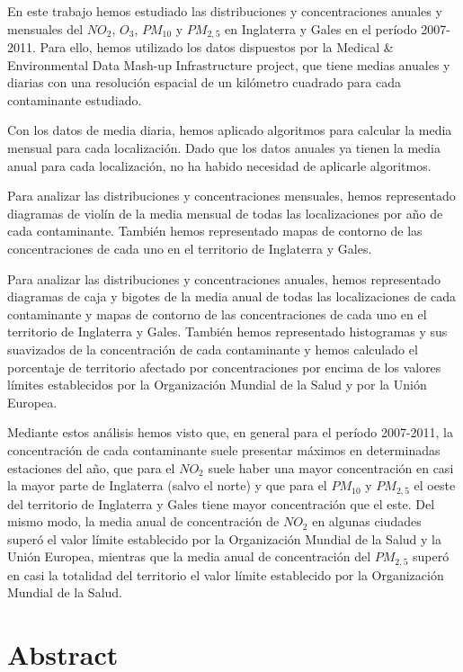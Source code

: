 \documentclass[12pt]{article}
\begin{document}
\normalsize En este trabajo hemos estudiado las distribuciones y concentraciones anuales y mensuales del $NO_{2}$, $O_{3}$, $PM_{10}$ y $PM_{2,5}$ en Inglaterra y Gales en el período 2007-2011. Para ello, hemos utilizado los datos dispuestos por la Medical \& Environmental Data Mash-up Infrastructure project, que tiene medias anuales y diarias con una resolución espacial de un kilómetro cuadrado para cada contaminante estudiado.

Con los datos de media diaria, hemos aplicado algoritmos para calcular la media mensual para cada localización. Dado que los datos anuales ya tienen la media anual para cada localización, no ha habido necesidad de aplicarle algoritmos.

Para analizar las distribuciones y concentraciones mensuales, hemos representado diagramas de violín de la media mensual de todas las localizaciones por año de cada contaminante. También hemos representado mapas de contorno de las concentraciones de cada uno en el territorio de Inglaterra y Gales.

Para analizar las distribuciones y concentraciones anuales, hemos representado diagramas de caja y bigotes de la media anual de todas las localizaciones de cada contaminante y mapas de contorno de las concentraciones de cada uno en el territorio de Inglaterra y Gales. También hemos representado histogramas y sus suavizados de la concentración de cada contaminante y hemos calculado el porcentaje de territorio afectado por concentraciones por encima de los valores límites establecidos por la Organización Mundial de la Salud y por la Unión Europea.

Mediante estos análisis hemos visto que, en general para el período 2007-2011, la concentración de cada contaminante suele presentar máximos en determinadas estaciones del año, que para el $NO_{2}$ suele haber una mayor concentración en casi la mayor parte de Inglaterra (salvo el norte) y que para el $PM_{10}$ y $PM_{2,5}$ el oeste del territorio de Inglaterra y Gales tiene mayor concentración que el este. Del mismo modo, la media anual de concentración de $NO_{2}$ en algunas ciudades superó el valor límite establecido por la Organización Mundial de la Salud y la Unión Europea, mientras que la media anual de concentración del $PM_{2,5}$ superó en casi la totalidad del territorio el valor límite establecido por la Organización Mundial de la Salud.

\vspace{0.5cm}

\section*{Abstract}
\end{document}

